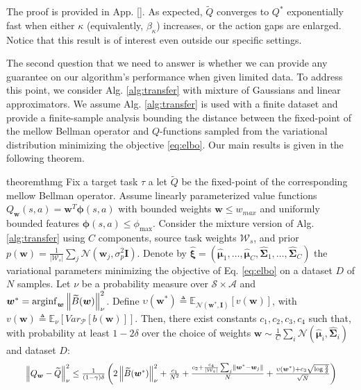 \documentclass{article}
\newcommand{\arginf}{\operatornamewithlimits{arginf}}
\newcommand{\wt}[1]{\widetilde{#1}}
\newcommand{\wh}[1]{\widehat{#1}}
\newcommand{\norm}[1]{\left\lVert #1 \right\rVert}
\newcommand{\abs}[1]{\left\lvert #1 \right\rvert}
\begin{document}
The proof is provided in App. \ref{}. As expected, $\wt{Q}$ converges to $Q^*$ exponentially fast when either $\kappa$ (equivalently, $\beta_{\kappa}$) increases, or the action gaps are enlarged. Notice that this result is of interest even outside our specific settings.

The second question that we need to answer is whether we can provide any guarantee on our algorithm's performance when given limited data. To address this point, we consider Alg. \ref{alg:transfer} with mixture of Gaussians and linear approximators. We assume Alg. \ref{alg:transfer} is used with a finite dataset and provide a finite-sample analysis bounding the distance between the fixed-point of the mellow Bellman operator and $Q$-functions sampled from the variational distribution minimizing the objective \eqref{eq:elbo}. Our main results is given in the following theorem.

\begin{restatable}{theorem}{thmg} \label{th:main-mixture}
Fix a target task $\tau$ a let $\wt{Q}$ be the fixed-point of the corresponding mellow Bellman operator. Assume linearly parameterized value functions $Q_{\bm{w}}(s,a)=\bm{w}^T\bm{\phi}(s,a)$ with bounded weights $\bm{w}\leq w_{max}$ and uniformly bounded features $\bm{\phi}(s,a)\leq \phi_{\max}$. Consider the mixture version of Alg. \ref{alg:transfer} using $C$ components, source task weights $\mathcal{W}_s$, and prior $p(\bm{w}) =\frac{1}{\abs{\mathcal{W}_s}}\sum_j\mathcal{N}(\bm{w}_j,\sigma^2_p\bm{I})$. Denote by $\wh{\bm{\xi}} = (\wh{\bm{\mu}}_1,\dots,\wh{\bm{\mu}}_C,\wh{\bm{\Sigma}}_1,\dots,\wh{\bm{\Sigma}}_C)$ the variational parameters minimizing the objective of Eq. \ref{eq:elbo} on a dataset $D$ of $N$ samples. Let $\nu$ be a probability measure over $\mathcal{S}\times\mathcal{A}$ and $\bm{w}^* = \arginf_{\bm{w}}\norm{\wt{B}(\bm{w})}_{\nu}^2$. Define $\upsilon(\bm{w}^*) \triangleq \mathbb{E}_{\mathcal{N}(\bm{w}^*,\bm{I})}\left[ v(\bm{w}) \right]$, with $v(\bm{w}) \triangleq \mathbb{E}_{\nu}\left[Var_{\mathcal{P}}\left[b(\bm{w})\right]\right]$. Then, there exist constants $c_1,c_2,c_3,c_4$ such that, with probability at least $1-2\delta$ over the choice of weights $\bm{w} \sim \frac{1}{C}\sum_i\mathcal{N}(\wh{\bm{\mu}}_i,\wh{\bm{\Sigma}}_i)$ and dataset $D$:
\begin{equation}
\resizebox{0.93\textwidth}{!}{$
\norm{Q_{\bm{w}} - \wt{Q}}_{\nu}^2 \leq \frac{1}{(1-\gamma)\delta}\left(2\norm{\wt{B}(\bm{w}^{*})}_{\nu}^2 + \frac{c_1}{N^2} + \frac{c_2 + \frac{c_4}{\abs{\mathcal{W}_s}}\sum_{j}\norm{\bm{w}^* - \bm{w}_{j}}}{N} + \frac{\upsilon(\bm{w}^*) + c_3\sqrt{\log\frac{2}{\delta}}}{\sqrt{N}}\right)$}
\end{equation}
\end{restatable}
\end{document}
